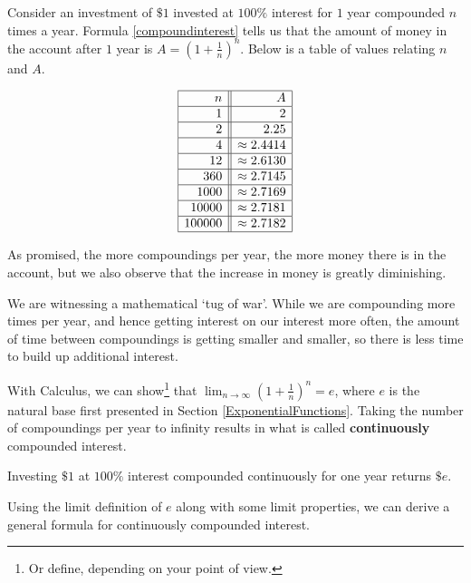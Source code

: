 \documentclass{ximera}
\begin{document}
 

Consider an investment of $\$ 1$ invested at $100 \%$ interest for $1$ year compounded $n$ times a year.  Formula \ref{compoundinterest} tells us that the amount of money in the account after $1$ year is $A = \left(1+\frac{1}{n}\right)^{n}$.  Below is a table of values relating $n$ and $A$.

\[ \begin{array}{|r||r|}  \hline
 n & A   \\ \hline
1  & 2  \\  \hline
2  & 2.25  \\  \hline
4 & \approx 2.4414  \\  \hline
12 & \approx 2.6130  \\  \hline
360  & \approx  2.7145 \\  \hline
1000  & \approx 2.7169 \\  \hline
10000  & \approx 2.7181  \\  \hline
100000 & \approx 2.7182  \\  \hline
\end{array} \]

As promised, the more compoundings per year, the more money there is in the account, but we also observe that the increase in money is greatly diminishing.  

We are witnessing a mathematical `tug of war'.  While we are compounding more times per year, and hence getting interest on our interest more often, the amount of time between compoundings is getting smaller and smaller, so there is less time to build up additional interest. 


With Calculus, we can show\footnote{Or define, depending on your point of view.} that $\lim_{n \rightarrow \infty} \left(1+\frac{1}{n}\right)^{n} = e$, where $e$ is the natural base first presented in Section \ref{ExponentialFunctions}.  Taking the number of compoundings per year to infinity results in what is called  \textbf{continuously} compounded interest.  



\begin{theorem} \label{whatise} Investing $\$1$ at $100 \%$ interest compounded continuously for one year returns $\$ e$. 

\end{theorem}




Using the limit definition of $e$ along with some limit properties, we can derive a general formula for continuously compounded interest. 
\end{document}
